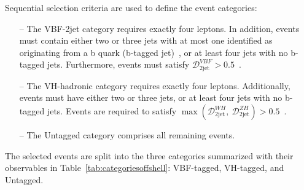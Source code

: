 
Sequential selection criteria are used to define the event categories:
\begin{itemize}
    \item[--] The VBF-2jet category requires exactly four leptons. In addition, events must contain either two or three jets with at most one identified as originating from a b quark (b-tagged jet)~\cite{Sirunyan:2021rug}, or at least four jets with no b-tagged jets. Furthermore, events must satisfy $\mathcal{D}_\text{2jet}^{VBF} > 0.5$~\cite{Sirunyan:2021rug}.
    
    \item[--] The VH-hadronic category requires exactly four leptons. Additionally, events must have either two or three jets, or at least four jets with no b-tagged jets. Events are required to satisfy $\max(\mathcal{D}_\text{2jet}^{WH},~\mathcal{D}_\text{2jet}^{ZH}) > 0.5$~\cite{Sirunyan:2021rug}.
    
    \item[--] The Untagged category comprises all remaining events.
\end{itemize}

The selected events are split into the three categories summarized with their observables in Table~\ref{tab:categoriesoffshell}: VBF-tagged, VH-tagged, and Untagged.

